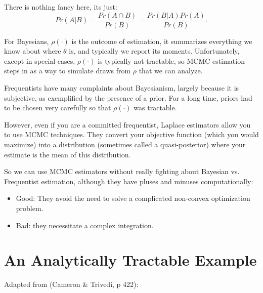 \documentclass[twoside]{article}
\begin{document}
There is nothing fancy here, its just: 
$$Pr(A | B) = \frac{Pr(A \cap B)}{Pr(B)} = \frac{Pr(B|A) Pr(A)}{Pr(B)}.$$

For Bayesians, $\rho(\cdot)$ is the outcome of estimation, it summarizes everything we know about where $\theta$ is, and typically we report its moments. Unfortunately, except in special cases, $\rho(\cdot)$ is typically not tractable, so MCMC estimation steps in as a way to simulate draws from $\rho$ that we can analyze. 

Frequentists have many complaints about Bayesianism, largely because it is subjective, as exemplified by the presence of a prior. For a long time, priors had to be chosen very carefully so that $\rho(\cdot)$ was tractable. 

However, even if you are a committed frequentist, Laplace estimators allow you to use MCMC techniques. They convert your objective function (which you would maximize) into a distribution (sometimes called a quasi-posterior) where your estimate is the mean of this distribution. 

So we can use MCMC estimators without really fighting about Bayesian vs. Frequentist estimation, although they have pluses and minuses computationally: 
\begin{itemize}
\item Good: They avoid the need to solve a complicated non-convex optimization problem. 
\item Bad: they necessitate a complex integration. 
\end{itemize}


\section{An Analytically Tractable Example }

Adapted from (Cameron \& Trivedi, p 422):  
\end{document}
